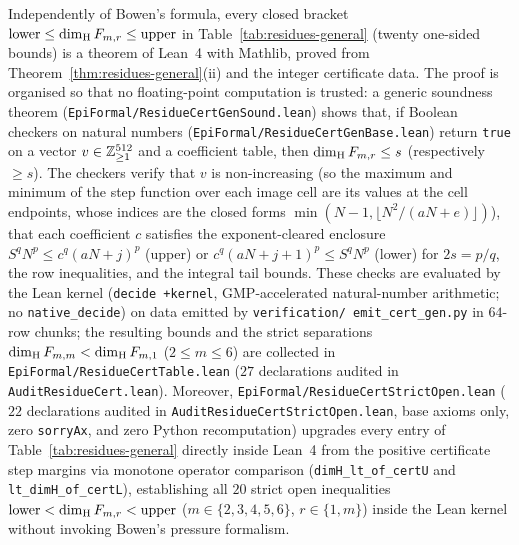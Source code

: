 \begin{remark}\label{rem:residue-kernel}
Independently of Bowen's formula, every closed bracket
$\mathrm{lower}\le\dim_{\mathrm{H}} F_{m,r}\le\mathrm{upper}$ in Table~\ref{tab:residues-general}
(twenty one-sided bounds) is a theorem of Lean~4 with Mathlib, proved from
Theorem~\ref{thm:residues-general}(ii) and the integer certificate data. The proof is
organised so that no floating-point computation is trusted: a generic soundness theorem
(\texttt{EpiFormal/\allowbreak ResidueCertGenSound.lean}) shows that, if Boolean checkers on
natural numbers (\texttt{EpiFormal/\allowbreak ResidueCertGenBase.lean}) return \texttt{true}
on a vector $v\in\mathbb{Z}_{\ge1}^{512}$ and a coefficient table, then $\dim_{\mathrm{H}} F_{m,r}\le s$
(respectively $\ge s$). The checkers verify that $v$ is non-increasing (so the maximum and
minimum of the step function over each image cell are its values at the cell endpoints,
whose indices are the closed forms $\min(N-1,\lfloor N^2/(aN+e)\rfloor)$), that each
coefficient $c$ satisfies the exponent-cleared enclosure
$S^qN^p\le c^q(aN+j)^p$ (upper) or $c^q(aN+j+1)^p\le S^qN^p$ (lower) for $2s=p/q$, the
row inequalities, and the integral tail bounds. These checks are evaluated by the Lean
kernel (\texttt{decide +kernel}, GMP-accelerated natural-number arithmetic; no
\texttt{native\_decide}) on data emitted by \texttt{verification/\allowbreak
emit\_cert\_gen.py} in $64$-row chunks; the resulting bounds and the strict separations
$\dim_{\mathrm{H}} F_{m,m}<\dim_{\mathrm{H}} F_{m,1}$ ($2\le m\le6$) are collected in
\texttt{EpiFormal/\allowbreak ResidueCertTable.lean} ($27$ declarations audited in \texttt{AuditResidueCert.lean}). Moreover, \texttt{EpiFormal/\allowbreak ResidueCertStrictOpen.lean} ($22$ declarations audited in \texttt{AuditResidueCertStrictOpen.lean}, base axioms only, zero \texttt{sorryAx}, and zero Python recomputation) upgrades every entry of Table~\ref{tab:residues-general} directly inside Lean~4 from the positive certificate step margins via monotone operator comparison (\texttt{dimH\_lt\_of\_certU} and \texttt{lt\_dimH\_of\_certL}), establishing all $20$ strict open inequalities $\mathrm{lower}<\dim_{\mathrm{H}} F_{m,r}<\mathrm{upper}$ ($m\in\{2,3,4,5,6\}$, $r\in\{1,m\}$) inside the Lean kernel without invoking Bowen's pressure formalism.
\end{remark}


